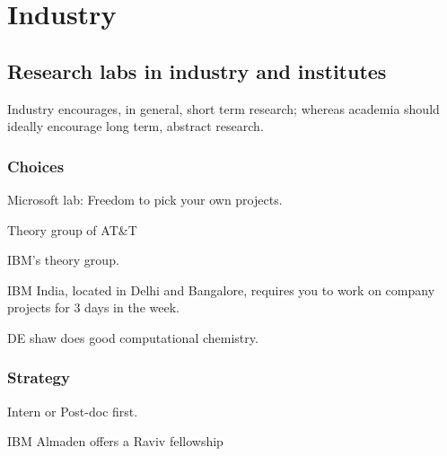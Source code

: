 \documentclass[oneside, article]{memoir}
\begin{document}
\chapter{Industry}
\section{Research labs in industry and institutes}
Industry encourages, in general, short term research; whereas academia should ideally encourage long term, abstract research.

\subsection{Choices}
Microsoft lab: Freedom to pick your own projects.

Theory group of AT\&T

IBM's theory group.

IBM India, located in Delhi and Bangalore, requires you to work on company projects for 3 days in the week.

DE shaw does good computational chemistry.

\subsection{Strategy}
Intern or Post-doc first.

IBM Almaden offers a Raviv fellowship
\end{document}
